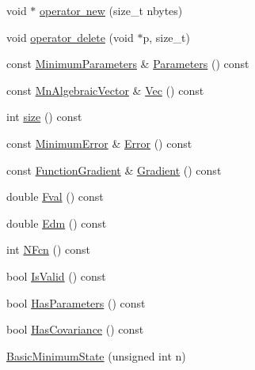 \begin{DoxyCompactItemize}
void $\ast$ \mbox{\hyperlink{classROOT_1_1Minuit2_1_1BasicMinimumState_ad0e5ab496757c5bee3544485a49fe7aa}{operator new}} (size\+\_\+t nbytes)
\item 
void \mbox{\hyperlink{classROOT_1_1Minuit2_1_1BasicMinimumState_a19ccca7f7825c16fca3c7ab6f147fdd6}{operator delete}} (void $\ast$p, size\+\_\+t)
\item 
const \mbox{\hyperlink{classROOT_1_1Minuit2_1_1MinimumParameters}{Minimum\+Parameters}} \& \mbox{\hyperlink{classROOT_1_1Minuit2_1_1BasicMinimumState_a0b72fce84557374c989a6581711e6e6a}{Parameters}} () const
\item 
const \mbox{\hyperlink{namespaceROOT_1_1Minuit2_a62ed97730a1ca8d3fbaec64a19aa11c9}{Mn\+Algebraic\+Vector}} \& \mbox{\hyperlink{classROOT_1_1Minuit2_1_1BasicMinimumState_a43ea742b5bd55d2c4e9d6b75308fb875}{Vec}} () const
\item 
int \mbox{\hyperlink{classROOT_1_1Minuit2_1_1BasicMinimumState_a12c3b0b51b127384c53029c54c984590}{size}} () const
\item 
const \mbox{\hyperlink{classROOT_1_1Minuit2_1_1MinimumError}{Minimum\+Error}} \& \mbox{\hyperlink{classROOT_1_1Minuit2_1_1BasicMinimumState_a67a7536f33473e23c3461e0c7029e5c5}{Error}} () const
\item 
const \mbox{\hyperlink{classROOT_1_1Minuit2_1_1FunctionGradient}{Function\+Gradient}} \& \mbox{\hyperlink{classROOT_1_1Minuit2_1_1BasicMinimumState_a45b6c728054b409349fb2f6f725a8ab6}{Gradient}} () const
\item 
double \mbox{\hyperlink{classROOT_1_1Minuit2_1_1BasicMinimumState_a5151d99e7c6cd7f3b070ad2c62222010}{Fval}} () const
\item 
double \mbox{\hyperlink{classROOT_1_1Minuit2_1_1BasicMinimumState_a20ae93898c8b726d9e36c40160d23fa9}{Edm}} () const
\item 
int \mbox{\hyperlink{classROOT_1_1Minuit2_1_1BasicMinimumState_ac4566e929ac5ec9fe2dba914bb21207b}{N\+Fcn}} () const
\item 
bool \mbox{\hyperlink{classROOT_1_1Minuit2_1_1BasicMinimumState_af92e32efe08fa047bc433db6f058d11a}{Is\+Valid}} () const
\item 
bool \mbox{\hyperlink{classROOT_1_1Minuit2_1_1BasicMinimumState_a1af83c0464c727dc173834c1612f5e49}{Has\+Parameters}} () const
\item 
bool \mbox{\hyperlink{classROOT_1_1Minuit2_1_1BasicMinimumState_a9d43155058c576759d062561d77b3e1d}{Has\+Covariance}} () const
\item 
\mbox{\hyperlink{classROOT_1_1Minuit2_1_1BasicMinimumState_a5442cd6f54e10c1a7e888d013393fbf6}{Basic\+Minimum\+State}} (unsigned int n)

\end{DoxyCompactItemize}
